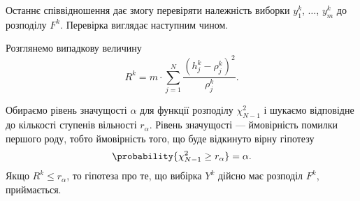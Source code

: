 Останнє співвідношення дає змогу перевіряти належність виборки
$y_1^k$, $\dots$, $y_m^k$ до розподілу $F^k$.
Перевірка виглядає наступним чином.

Розглянемо випадкову величину
\begin{equation}\label{eq:pearson:Rk}
  R^k
  = m \cdot \sum_{j=1}^{N}\frac{\left( h_j^k - \rho_j^k \right)^2}{\rho_j^k}.
\end{equation}

Обираємо рівень значущості $\alpha$ для функції розподілу $\chi_{N-1}^2$ і
шукаємо відповідне до кількості ступенів вільності $r_{\alpha}$.
Рівень значущості --- ймовірність помилки першого роду, тобто ймовірність того,
що буде відкинуто вірну гіпотезу
\begin{equation*}
  \probability{\chi_{N-1}^2 \ge r_{\alpha}} = \alpha.
\end{equation*}
Якщо $R^k \le r_{\alpha}$, то гіпотеза про те, що вибірка $Y^k$ дійсно має
розподіл $F^k$, приймається.

